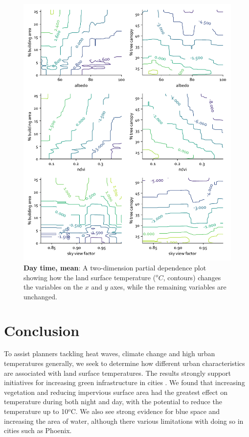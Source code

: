 \documentclass[final,3p,times,twocolumn,sort&compress]{elsarticle}
\begin{document}
\begin{figure}
    \centering
    \includegraphics[width=\linewidth]{fig/report/pdp_2d_day_500.pdf}
    \caption{
    \textbf{Day time, mean}: A two-dimension partial dependence plot showing how the land surface temperature ($^oC$, contours) changes the variables on the $x$ and $y$ axes, while the remaining variables are unchanged.
    }
    \label{fig:pdp_2dday_500}
\end{figure}


\section{Conclusion}
To assist planners tackling heat waves, climate change and high urban temperatures generally, we seek to determine how different urban characteristics are associated with land surface temperatures. 
The results strongly support initiatives for increasing green infrastructure in cities \cite{Larsen2015-da, Meerow2017-xv}. 
We found that increasing vegetation and reducing impervious surface area had the greatest effect on temperature during both night and day, with the potential to reduce the temperature up to 10$^o$C.
We also see strong evidence for blue space and increasing the area of water, although there various limitations with doing so in cities such as Phoenix.
\end{document}
